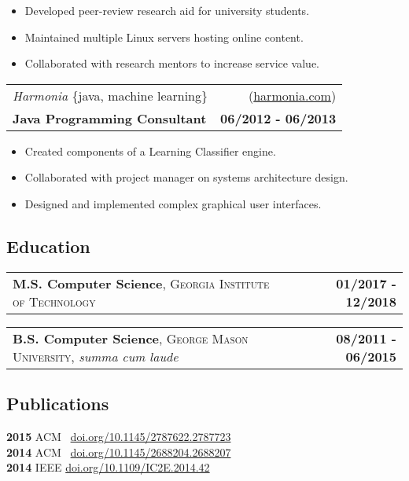 \documentclass[10pt,letterpaper]{article}
\begin{document}
\begin{itemize}
\item Developed peer-review research aid for university students.
\item Maintained multiple Linux servers hosting online content.
\item Collaborated with research mentors to increase service value.
\end{itemize}

\vspace{0.25cm}

\noindent\begin{tabularx}{\textwidth}{@{} Xr @{}}
  \textit{Harmonia} \{java, machine learning\} & (\href{https://harmonia.com}{harmonia.com}) \\
  \textbf{Java Programming Consultant} & \textbf{06/2012 - 06/2013}
\end{tabularx}

\begin{itemize}
\item Created components of a Learning Classifier engine.
\item Collaborated with project manager on systems architecture design.
\item Designed and implemented complex graphical user interfaces.
\end{itemize}

\subsection{Education}

\noindent
\begin{tabularx}{\textwidth}{@{} Xr @{}}
  \textbf{M.S. Computer Science}, \textsc{Georgia Institute of Technology} & \textbf{01/2017 - 12/2018}
\end{tabularx}

\noindent
\begin{tabularx}{\textwidth}{@{} Xr @{}}
  \textbf{B.S. Computer Science}, \textsc{George Mason University}, \emph{summa cum laude} & \textbf{08/2011 - 06/2015}
\end{tabularx}

\subsection{Publications}

\noindent
\textbf{2015} ACM \ \href{https://doi.org/10.1145/2787622.2787723}{doi.org/10.1145/2787622.2787723} \\
\textbf{2014} ACM \ \href{https://doi.org/10.1145/2688204.2688207}{doi.org/10.1145/2688204.2688207} \\
\textbf{2014} IEEE  \href{https://doi.org/10.1109/IC2E.2014.42}{doi.org/10.1109/IC2E.2014.42}
\end{document}
